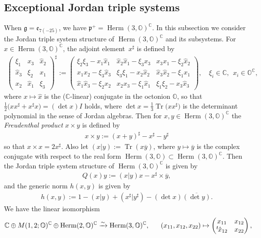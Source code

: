 \documentclass[pdftex]{sigma}
\numberwithin{equation}{section}
\newcommand{\BC}{\mathbb{C}}
\newcommand{\BO}{\mathbb{O}}
\newcommand{\fg}{\mathfrak{g}}
\newcommand{\fp}{\mathfrak{p}}
\newcommand{\Tr}{\operatorname{Tr}}
\newcommand{\Herm}{\operatorname{Herm}}
\begin{document}
\subsection{Exceptional Jordan triple systems}\label{EJTS}

When $\fg=\mathfrak{e}_{7(-25)}$, we have $\fp^+=\Herm(3,\BO)^\BC$. In this subsection we consider the Jordan triple system structure
of $\Herm(3,\BO)^\BC$ and its subsystems. For $x\in\Herm(3,\BO)^\BC$, the adjoint element~$x^\sharp$ is defined by
\begin{gather}\label{adjoint3}
\begin{pmatrix}\xi_1&x_3&\hat{x}_2\\\hat{x}_3&\xi_2&x_1\\x_2&\hat{x}_1&\xi_3\end{pmatrix}^\sharp\!
:=\!\begin{pmatrix}\xi_2\xi_3-x_1\hat{x}_1&\hat{x}_2\hat{x}_1-\xi_3x_3&x_3x_1-\xi_2\hat{x}_2\\
x_1x_2-\xi_3\hat{x}_3&\xi_3\xi_1-x_2\hat{x}_2&\hat{x}_3\hat{x}_2-\xi_1x_1\\
\hat{x}_1\hat{x}_3-\xi_2x_2&x_2x_3-\xi_1\hat{x}_1&\xi_1\xi_2-x_3\hat{x}_3\end{pmatrix}\!, \quad \xi_i\in\BC,\ \ x_i\in\BO^\BC,
\end{gather}
where $x\mapsto\hat{x}$ is the ($\BC$-linear) conjugate in the octonion $\BO$, so that $\frac{1}{2}\big(xx^\sharp+x^\sharp x\big)=(\det x)I$ holds,
where $\det x=\frac{1}{3}\Tr\big(xx^\sharp\big)$ is the determinant polynomial in the sense of Jordan algebras.
Then for $x,y\in\Herm(3,\BO)^\BC$ the \textit{Freudenthal product} $x\times y$ is defined by
\begin{gather}\label{Freudenthal_def}
x\times y:=(x+y)^\sharp-x^\sharp-y^\sharp
\end{gather}
so that $x\times x=2x^\sharp$. Also let $(x|y):=\Tr(x\overline{y})$, where $y\mapsto\overline{y}$ is the complex conjugate with respect to the
real form $\Herm(3,\BO)\subset\Herm(3,\BO)^\BC$. Then the Jordan triple system structure of $\Herm(3,\BO)^\BC$ is given by
\begin{gather*} Q(x)y:=(x|y)x-x^\sharp\times\overline{y}, \end{gather*}
and the generic norm $h(x,y)$ is given by
\begin{gather*} h(x,y):=1-(x|y)+(x^\sharp|y^\sharp)-(\det x)\overline{(\det y)}. \end{gather*}
We have the linear isomorphism
\begin{gather}\label{Herm3O}
\BC\oplus M(1,2;\BO)^\BC\oplus\Herm(2,\BO)^\BC\xrightarrow{\sim}\Herm(3,\BO)^\BC,\qquad\!\!
(x_{11},x_{12},x_{22})\mapsto \begin{pmatrix}x_{11}&x_{12}\\{}^t\hspace{-1pt}\hat{x}_{12}&x_{22}\end{pmatrix},\!\!\!
\end{gather}
\end{document}
